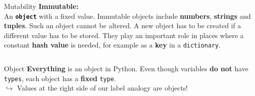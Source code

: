     \begin{frame}{Mutability}
        \huge
        \textbf{Immutable:}\\
        \LARGE
        An \texttt{\textbf{object}} with a fixed value.
         Immutable objects include \textbf{numbers}, \textbf{strings} and \textbf{tuples}. Such an object cannot be altered.
         A new object has to be created if a different value has to be stored.
         They play an important role in places where a constant \textbf{hash value} is needed, for example as a \textbf{key} in a \texttt{dictionary}.
        \inputminted[frame=single,framesep=2pt]{python3}{../Lecture5/code-examples/value_update.py}
    \end{frame}

    \begin{frame}{Object}
        \LARGE
        \textbf{Everything} is an object in Python.
        \pause
         Even though variables \textbf{do not} have \texttt{types}, each object has a \textbf{fixed} \texttt{type}.\\
        \pause
        $\hookrightarrow$ Values at the right side of our label analogy are objects!
        \bigskip
        \begin{columns}
            \begin{column}[c]{0.5\textwidth}
                \LARGE
            \end{column}
            \begin{column}[c]{0.5\textwidth}
           \end{column}
       \end{columns}
    \end{frame}

